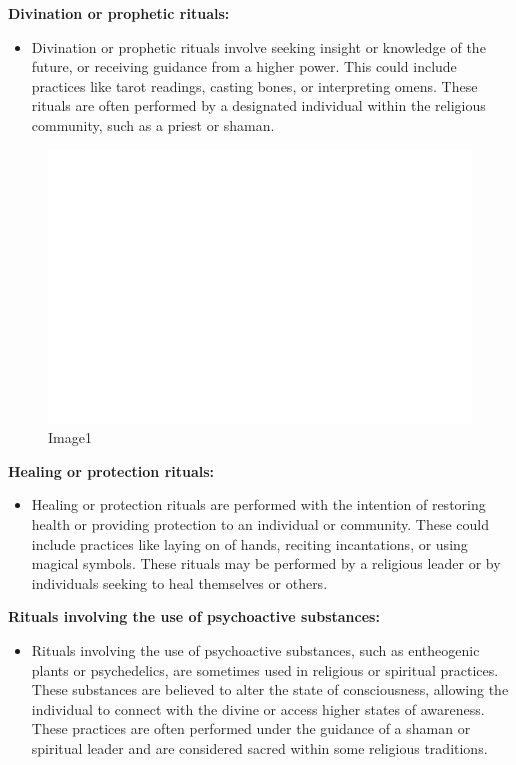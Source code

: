\textbf{Divination or prophetic rituals:}

\begin{itemize}
\tightlist
\item
  Divination or prophetic rituals involve seeking insight or knowledge
  of the future, or receiving guidance from a higher power. This could
  include practices like tarot readings, casting bones, or interpreting
  omens. These rituals are often performed by a designated individual
  within the religious community, such as a priest or shaman.
\end{itemize}

\begin{figure}
\centering
\includegraphics{./images/religion08.svg}
\caption{Image1}
\end{figure}

\textbf{Healing or protection rituals:}

\begin{itemize}
\tightlist
\item
  Healing or protection rituals are performed with the intention of
  restoring health or providing protection to an individual or
  community. These could include practices like laying on of hands,
  reciting incantations, or using magical symbols. These rituals may be
  performed by a religious leader or by individuals seeking to heal
  themselves or others.
\end{itemize}

\textbf{Rituals involving the use of psychoactive substances:}

\begin{itemize}
\tightlist
\item
  Rituals involving the use of psychoactive substances, such as
  entheogenic plants or psychedelics, are sometimes used in religious or
  spiritual practices. These substances are believed to alter the state
  of consciousness, allowing the individual to connect with the divine
  or access higher states of awareness. These practices are often
  performed under the guidance of a shaman or spiritual leader and are
  considered sacred within some religious traditions.
\end{itemize}

